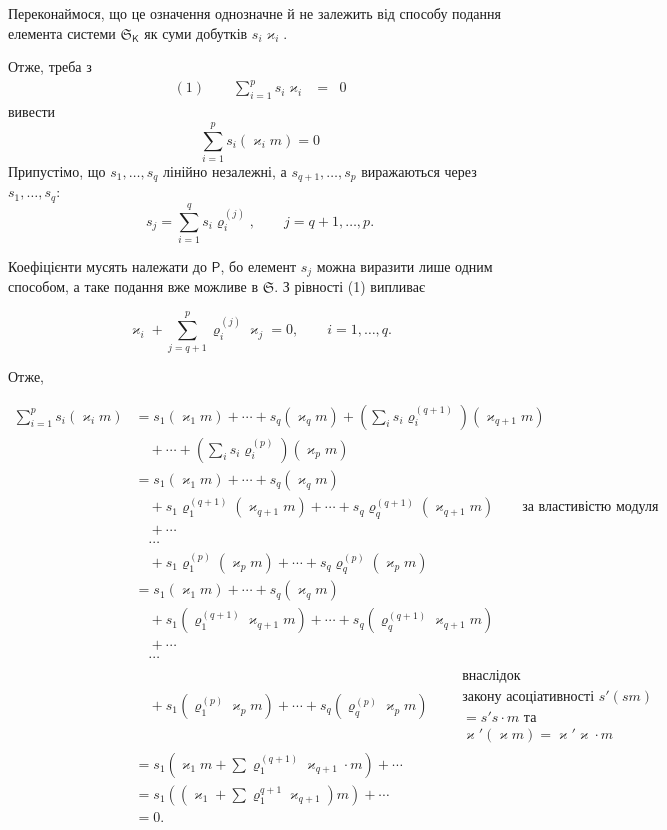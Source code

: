 \documentclass[11pt]{article}
\begin{document}
Переконаймося, що це означення однозначне й не залежить від способу подання елемента системи \(\mathfrak S_{\mathsf K}\) як суми добутків \(s_i\varkappa _i\).

Отже, треба з
\[
\begin{array}{rcl}
(1)\qquad \displaystyle\sum_{i=1}^{p}s_i\varkappa _i&=&0
\end{array}
\]
вивести
\[
\sum_{i=1}^{p}s_i(\varkappa _i m)=0
\]
Припустімо, що \(s_1,\ldots,s_q\) лінійно незалежні, а \(s_{q+1},\ldots,s_p\) виражаються через \(s_1,\ldots,s_q\):
\[
s_j=\sum_{i=1}^{q}s_i\varrho_i^{(j)},\qquad j=q+1,\ldots,p.
\]

Коефіцієнти мусять належати до \(\mathsf P\), бо елемент \(s_j\) можна виразити лише одним способом, а таке подання вже можливе в \(\mathfrak S\). З рівності (1) випливає

\[
\varkappa _i+\sum_{j=q+1}^{p}\varrho_i^{(j)}\varkappa _j=0,\qquad i=1,\ldots,q.
\]

Отже,

\[
\begin{aligned}
\sum_{i=1}^{p}s_i(\varkappa _i m)
&=s_1(\varkappa _1m)+\cdots+s_q(\varkappa _qm)
  +\left(\sum_i s_i\varrho_i^{(q+1)}\right)(\varkappa _{q+1}m)\\
&\quad+\cdots+\left(\sum_i s_i\varrho_i^{(p)}\right)(\varkappa _pm)\\
&=s_1(\varkappa _1m)+\cdots+s_q(\varkappa _qm)\\
&\quad+s_1\varrho_1^{(q+1)}(\varkappa _{q+1}m)+\cdots+s_q\varrho_q^{(q+1)}(\varkappa _{q+1}m)
  \qquad\text{за властивістю модуля}\\
&\quad+\cdots\\
&\quad\cdots\\
&\quad+s_1\varrho_1^{(p)}(\varkappa _pm)+\cdots+s_q\varrho_q^{(p)}(\varkappa _pm)\\
&=s_1(\varkappa _1m)+\cdots+s_q(\varkappa _qm)\\
&\quad+s_1(\varrho_1^{(q+1)}\varkappa _{q+1}m)+\cdots+s_q(\varrho_q^{(q+1)}\varkappa _{q+1}m)\\
&\quad+\cdots\\
&\quad\cdots\\
&\quad+s_1(\varrho_1^{(p)}\varkappa _pm)+\cdots+s_q(\varrho_q^{(p)}\varkappa _pm)
  \qquad\begin{gathered}\text{внаслідок}\\ \text{закону асоціативності }s'(sm)\\ =s's\cdot m\text{ та}\\ \varkappa '(\varkappa m)=\varkappa '\varkappa \cdot m\end{gathered}\\
&=s_1\left(\varkappa _1m+\sum\varrho_1^{(q+1)}\varkappa _{q+1}\cdot m\right)+\cdots\\
&=s_1\left(\left(\varkappa _1+\sum\varrho_1^{q+1}\varkappa _{q+1}\right)m\right)+\cdots\\
&=0.
\end{aligned}
\]
\end{document}
